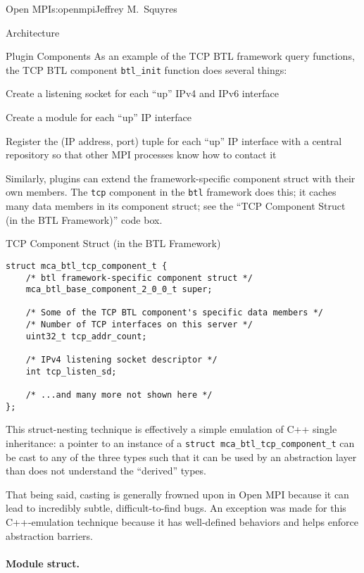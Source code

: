 \begin{aosachapter}{Open MPI}{s:openmpi}{Jeffrey M.\ Squyres}
\begin{aosasect1}{Architecture}
\begin{aosasect2}{Plugin Components}
As an example of the TCP BTL framework query functions, the TCP BTL
component {\tt btl\_\-init} function does several things:
\begin{aosaitemize}
\item Create a listening socket for each ``up'' IPv4 and IPv6 interface
\item Create a module for each ``up'' IP interface
\item Register the (IP address, port) tuple for each ``up'' IP
  interface with a central repository so that other MPI processes know
  how to contact it
\end{aosaitemize}

Similarly, plugins can extend the framework-specific component struct
with their own members.
%
The {\tt tcp} component in the {\tt btl} framework does this; it
caches many data members in its component struct; see the ``TCP
Component Struct (in the BTL Framework)'' code box.

\begin{aosabox}{TCP Component Struct (in the BTL Framework)}
\begin{verbatim}
struct mca_btl_tcp_component_t {
    /* btl framework-specific component struct */ 
    mca_btl_base_component_2_0_0_t super;

    /* Some of the TCP BTL component's specific data members */
    /* Number of TCP interfaces on this server */
    uint32_t tcp_addr_count;
    
    /* IPv4 listening socket descriptor */
    int tcp_listen_sd;

    /* ...and many more not shown here */
};
\end{verbatim}
\end{aosabox}

This struct-nesting technique is effectively a simple emulation of C++
single inheritance: a pointer to an instance of a {\tt struct
  mca\_\-btl\_\-tcp\_\-component\_\-t} can be cast to any of the
three types such that it can be used by an abstraction layer than does
not understand the ``derived'' types.

That being said, casting is generally frowned upon in Open MPI because
it can lead to incredibly subtle, difficult-to-find bugs.  
%
An exception was made for this C++-emulation technique because it has
well-defined behaviors and helps enforce abstraction barriers.


\paragraph{Module struct.}


\end{aosasect2}
\end{aosasect1}
\end{aosachapter}
